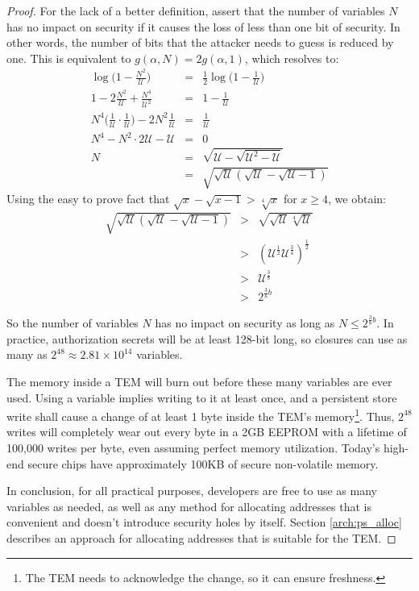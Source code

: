 \begin{proof}
For the lack of a better definition, assert that the number of variables
$N$ has no impact on security if it causes the loss of less than one bit of
security. In other words, the number of bits that the attacker needs to guess
is reduced by one. This is equivalent to $g(\alpha, N) = 2g(\alpha, 1)$, which
resolves to:
$$
\begin{array}{rcl}
\log\Big(1 - \frac{N^2}{\mathcal U}\Big) &=& \frac{1}{2}\log\Big(1 -
\frac{1}{\mathcal U}\Big)
\\
1 - 2\frac{N^2}{\mathcal U} + \frac{N^4}{{\mathcal U}^2} &=& 1 -
\frac{1}{\mathcal U}\\
N^4\big(\frac{1}{\mathcal U} \cdot \frac{1}{\mathcal U}
\big) - 2N^2\frac{1}{\mathcal U} &=& \frac{1}{\mathcal U} \\
N^4 - N^2\cdot 2\mathcal U - \mathcal{U} &=& 0\\
N &=& \sqrt{\mathcal U - \sqrt{\mathcal{U}^2 - \mathcal U}} \\
&=& \sqrt{\sqrt{\mathcal U}(\sqrt{\mathcal U} - \sqrt{\mathcal U - 1})}
\end{array}
$$
Using the easy to prove fact that $\sqrt{x} - \sqrt{x - 1} > \sqrt[4]{x}$ for
$x \ge 4$, we obtain:
$$
\begin{array}{rcl}
\sqrt{\sqrt{\mathcal U}(\sqrt{\mathcal U} - \sqrt{\mathcal U - 1})} & > & \sqrt{\sqrt{\mathcal
 U}\sqrt[4]{\mathcal U}} \\
 & > & (\mathcal{U}^{\frac{1}{2}}\mathcal{U}^{\frac{3}{4}})^{\frac{1}{2}} \\
 & > & \mathcal{U}^{\frac{3}{8}} \\
 & > & 2^{\frac{3}{8}b} 
\end{array}
$$

So the number of variables $N$ has no impact on security as long as $N \le
2^{\frac{3}{8}b}$. In practice, authorization secrets will be at least 128-bit
long, so closures can use as many as $2^{48} \approx 2.81 \times 10^{14} $
variables.

The memory inside a TEM will burn out before these many variables are ever
used. Using a variable implies writing to it at least once, and a persistent
store write shall cause a change of at least 1 byte inside the TEM's
memory\footnote{The TEM needs to acknowledge the change, so it can ensure
freshness.}. Thus, $2^{48}$ writes will completely wear out every byte in a 2GB
EEPROM with a lifetime of 100,000 writes per byte, even assuming
perfect memory utilization. Today's high-end secure chips have approximately 100KB of
secure non-volatile memory.

In conclusion, for all practical purposes, developers are free to use as many
variables as needed, as well as any method for allocating addresses that is
convenient and doesn't introduce security holes by itself. Section
\ref{arch:ps_alloc} describes an approach for allocating addresses that is
suitable for the TEM.
\end{proof}


